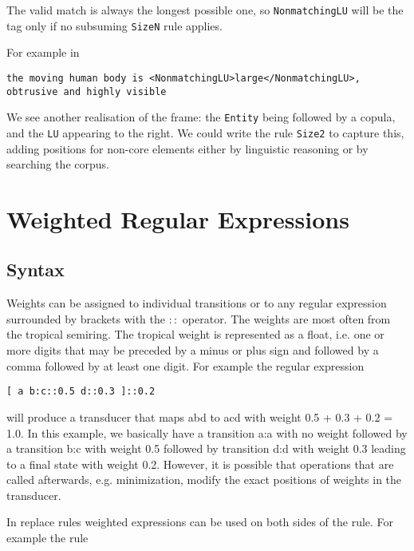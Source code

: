 \documentclass{llncs}
\begin{document}
The valid match is always the longest possible one, so \verb+NonmatchingLU+ will be the tag only if no subsuming \verb+SizeN+ rule applies.

For example in

\small
\begin{framed}
\begin{verbatim}
the moving human body is <NonmatchingLU>large</NonmatchingLU>,
obtrusive and highly visible
\end{verbatim}
\end{framed}
\normalsize

We see another realisation of the frame: the \verb+Entity+ being followed by a
copula, and the \verb+LU+ appearing to the right. We could write the rule
\verb+Size2+ to capture this, adding positions for non-core elements either by
linguistic reasoning or by searching the corpus.


\section{Weighted Regular Expressions}

\subsection{Syntax}

Weights can be assigned to individual transitions or to any regular expression surrounded by brackets
with the $::$ operator. The weights are most often from the tropical semiring. The tropical weight is
represented as a float, i.e. one or more digits that may be preceded by a minus or plus sign and followed
by a comma followed by at least one digit. For example the regular expression

\begin{framed}
\begin{verbatim}
[ a b:c::0.5 d::0.3 ]::0.2
\end{verbatim}
\end{framed}

will produce a transducer that maps abd to acd with weight 0.5 + 0.3 + 0.2 = 1.0. In this example,
we basically have a transition a:a with no weight followed by a transition b:c with weight 0.5
followed by transition d:d with weight 0.3 leading to a final state with weight 0.2. However, it is
possible that operations that are called afterwards, e.g. minimization, modify the exact positions
of weights in the transducer. 

In replace rules weighted expressions can be used on both sides of the rule.
For example the rule
\end{document}
